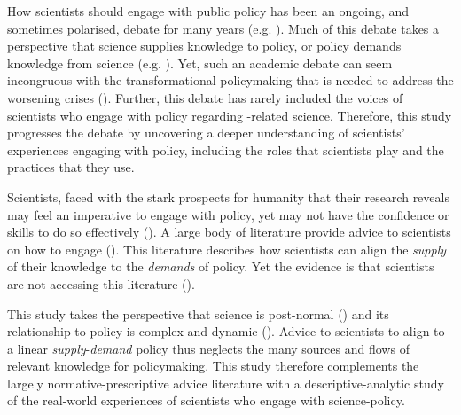 How scientists should engage with public policy has been an ongoing, and sometimes polarised, debate for many years (e.g. \cite{Lackey2004,Nau2009,Stirling2010,Milman2013,Tyler2013,Oreskes2020,GluckmanBK2021,GregoryBW2024,Bisbal2024,Hicks2024}). Much of this debate takes a perspective that science supplies knowledge to policy, or policy demands knowledge  from science (e.g. \cite{McNie2007,KennyRHTB2017,Castree2019}).   Yet, such an academic debate can seem incongruous with the transformational policymaking that is needed to address the worsening \CAN{} crises (\cite{LaybournTS2023,VerfuerthDCWP2023}). Further, this debate has rarely included the voices of scientists who engage with policy regarding \CAN-related science. Therefore, this study progresses the debate by uncovering a deeper understanding of scientists' experiences engaging with \CAN{} policy, including the roles that scientists play and the practices that they use.

Scientists, faced with the stark prospects for humanity that their research reveals may feel an imperative to engage with policy, yet may not have the confidence or skills to do so effectively (\cite{BednarekSHG2015,KennyRHTB2017,KEU2021perceptions}). A large body of literature provide advice to scientists on how to engage (\cite{OliverC2019}). This literature describes how scientists can align the \emph{supply} of their knowledge to the \emph{demands} of policy. Yet the evidence is that scientists are not accessing this literature (\cite{CairneyTS2023}). 

This study takes the perspective that \CAN{} science is post-normal (\cite{FuntowiczR1993,Gluckman2014}) and its relationship to \CAN{} policy is complex and dynamic (\cite{StrassheimK2014,BoswellS2017}). Advice to scientists to align to a linear \emph{supply}-\emph{demand} policy thus neglects the many sources and flows of relevant knowledge for \CAN{} policymaking. This study therefore complements the largely normative-prescriptive advice literature with a descriptive-analytic study of the real-world experiences of scientists who engage with \CAN{} science-policy.


